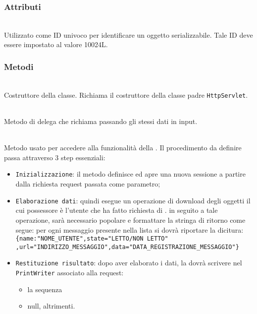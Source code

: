 \subsubsection*{Attributi}
\begin{description}
  \item{}\\
  Utilizzato come ID univoco per identificare un oggetto serializzabile. Tale ID deve essere impostato al valore 10024L.
\end{description}

\subsubsection*{Metodi}
\begin{description}
	\item{}\\
	Costruttore della classe. Richiama il costruttore della classe padre \texttt{HttpServlet}.
	
	\item{}\\
	Metodo di delega che richiama  passando gli stessi dati in input.
	
	\item{}\\
	Metodo usato per accedere alla funzionalità della . Il procedimento da definire passa attraverso 3 step essenziali:
	\begin{itemize}
		\item \texttt{Inizializzazione}: il metodo definisce ed apre una nuova sessione a partire dalla richiesta request passata come parametro;
		\item \texttt{Elaborazione dati}: quindi esegue un operazione di download degli oggetti  il cui possessore è l'utente che ha fatto richiesta di . in seguito a tale operazione, sarà necessario popolare e formattare la stringa di ritorno come segue: per ogni messaggio presente nella lista si dovrà riportare la dicitura:\\
		
		\verb|{name:"NOME_UTENTE",state="LETTO/NON LETTO"|\\
		\verb|,url="INDIRIZZO_MESSAGGIO",data="DATA_REGISTRAZIONE_MESSAGGIO"}|\\
	
		\item \texttt{Restituzione risultato}: dopo aver elaborato i dati, la  dovrà scrivere nel \texttt{PrintWriter} associato alla request:
			\begin{itemize}
				\item la sequenza
				\item null, altrimenti.
			\end{itemize}
	\end{itemize}

\end{description}

